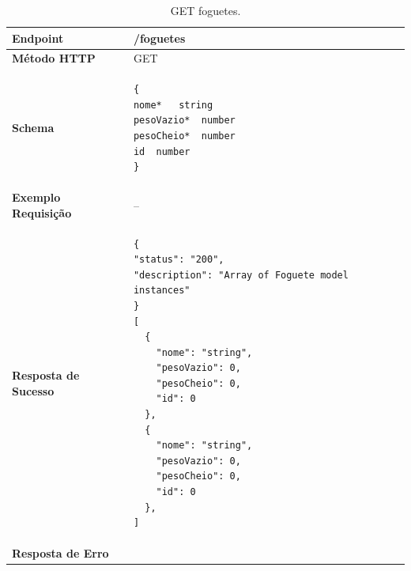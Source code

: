 \begin{apendicesenv}
\begin{table}[H]
\begin{tabular}{|l|l|}
\hline
\textbf{Endpoint}            & /foguetes \\ \hline
\textbf{Método HTTP}         & GET \\ \hline
\textbf{Schema}              &  
\begin{lstlisting}
{
nome*	string
pesoVazio*	number
pesoCheio*	number
id	number
}
\end{lstlisting}\\ \hline
\textbf{Exemplo Requisição}  &  -- \\ \hline
\textbf{Resposta de Sucesso} &
\begin{lstlisting}
{
"status": "200",
"description": "Array of Foguete model instances"
}
[
  {
    "nome": "string",
    "pesoVazio": 0,
    "pesoCheio": 0,
    "id": 0
  },
  {
    "nome": "string",
    "pesoVazio": 0,
    "pesoCheio": 0,
    "id": 0
  },
]
\end{lstlisting}
\\ \hline
\textbf{Resposta de Erro}    &  \\ \hline
\end{tabular}
\caption{GET foguetes.}
\label{get_foguetes}
\end{table}


\end{apendicesenv}
